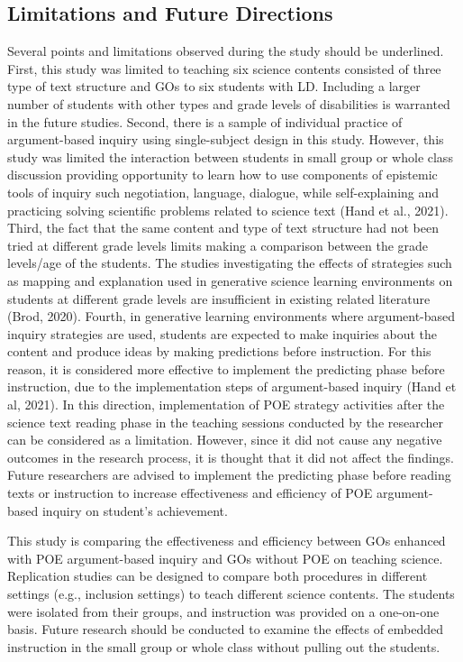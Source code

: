 \documentclass[11.5pt]{sig-alternate} %
\begin{document}
\begin{large}
\subsection*{Limitations and Future Directions}
Several points and limitations observed during the study should be underlined. First, this study was limited to teaching six science contents consisted of three type of text structure and GOs to six students with LD. Including a larger number of students with other types and grade levels of disabilities is warranted in the future studies. Second, there is a sample of individual practice of argument-based inquiry using single-subject design in this study. However, this study was limited the interaction between students in small group or whole class discussion providing opportunity to learn how to use components of epistemic tools of inquiry such negotiation, language, dialogue, while self-explaining and practicing solving scientific problems related to science text (Hand et al., 2021). Third, the fact that the same content and type of text structure had not been tried at different grade levels limits making a comparison between the grade levels/age of the students. The studies investigating the effects of strategies such as mapping and explanation used in generative science learning environments on students at different grade levels are insufficient in existing related literature (Brod, 2020). Fourth, in generative learning environments where argument-based inquiry strategies are used, students are expected to make inquiries about the content and produce ideas by making predictions before instruction. For this reason, it is considered more effective to implement the predicting phase before instruction, due to the implementation steps of argument-based inquiry (Hand et al, 2021). In this direction, implementation of POE strategy activities after the science text reading phase in the teaching sessions conducted by the researcher can be considered as a limitation. However, since it did not cause any negative outcomes in the research process, it is thought that it did not affect the findings. Future researchers are advised to implement the predicting phase before reading texts or instruction to increase effectiveness and efficiency of POE argument-based inquiry on student’s achievement. 

This study is comparing the effectiveness and efficiency between GOs enhanced with POE argument-based inquiry and GOs without POE on teaching science. Replication studies can be designed to compare both procedures in different settings (e.g., inclusion settings) to teach different science contents. The students were isolated from their groups, and instruction was provided on a one-on-one basis. Future research should be conducted to examine the effects of embedded instruction in the small group or whole class without pulling out the students.


\end{large}
\end{document}
